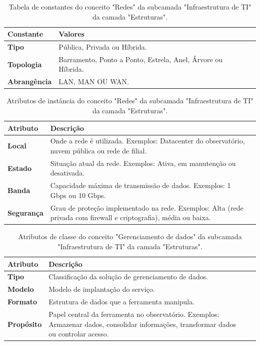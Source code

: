 \begin{apendicesenv}
\begin{table}[H]
\centering
\caption{Tabela de constantes do conceito "Redes" da subcamada "Infraestrutura de TI" da camada "Estruturas".}
\begin{tabularx}{\textwidth}{|l|X|X|}
\hline
\textbf{Constante} & \textbf{Valores} \\ \hline
\textbf{Tipo}  & Pública, Privada ou Híbrida. \\ \hline
\textbf{Topologia} & Barramento, Ponto a Ponto, Estrela, Anel, Árvore ou Híbrida. \\ \hline
\textbf{Abrangência} & LAN, MAN OU WAN. \\ \hline
\end{tabularx}
\end{table}

\begin{table}[H]
\centering
\caption{Atributos de instância do conceito "Redes" da subcamada "Infraestrutura de TI" da camada "Estruturas".}
\begin{tabularx}{\textwidth}{|l|X|X|}
\hline
\textbf{Atributo} & \textbf{Descrição} \\ \hline
\textbf{Local}  & Onde a rede é utilizada. Exemplos: Datacenter do observatório, nuvem pública ou rede de filial. \\ \hline
\textbf{Estado} & Situação atual da rede. Exemplos: Ativa, em manutenção ou desativada. \\ \hline
\textbf{Banda} & Capacidade máxima de transmissão de dados. Exemplos: 1 Gbps ou 10 Gbps. \\ \hline
\textbf{Segurança} & Grau de proteção implementado na rede. Exemplos: Alta (rede privada com firewall e criptografia), média ou baixa. \\ \hline
\end{tabularx}
\end{table}

\begin{table}[H]
\centering
\caption{Atributos de classe do conceito "Gerenciamento de dados" da subcamada "Infraestrutura de TI" da camada "Estruturas".}
\begin{tabularx}{\textwidth}{|l|X|X|}
\hline
\textbf{Atributo} & \textbf{Descrição} \\ \hline
\textbf{Tipo} & Classificação da solução de gerenciamento de dados. \\ \hline
\textbf{Modelo} & Modelo de implantação do serviço.\\ \hline
\textbf{Formato} & Estrutura de dados que a ferramenta manipula.\\ \hline
\textbf{Propósito} & Papel central da ferramenta no observatório. Exemplos: Armazenar dados, consolidar informações, transformar dados ou controlar acesso. \\ \hline
\end{tabularx}
\end{table}


\end{apendicesenv}
